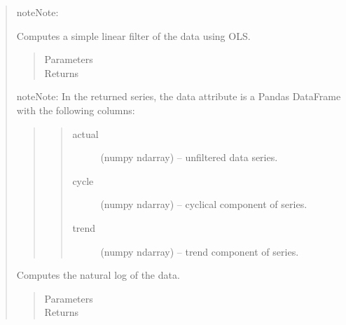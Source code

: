 \documentclass[letterpaper,10pt,english]{sphinxmanual}
\begin{document}
\begin{fulllineitems}
\begin{quote}
\begin{fulllineitems}
\begin{notice}{note}{Note:}
\begin{quote}
\begin{quote}
\begin{description}
\end{description}\end{quote}
\end{quote}
\end{notice}

\end{fulllineitems}


\begin{fulllineitems}
\label{series_class:fredpy.series.lintrend}
Computes a simple linear filter of the data using OLS.
\begin{quote}\begin{description}
\item[{Parameters}] \leavevmode
\item[{Returns}] \leavevmode
{\hyperref[series_class:fredpy.series]{}}

\end{description}\end{quote}

\begin{notice}{note}{Note:}
In the returned series, the data attribute is a Pandas DataFrame with the following columns:
\begin{quote}
\begin{quote}\begin{description}
\item[{actual}] \leavevmode
(numpy ndarray) --  unfiltered data series.

\item[{cycle}] \leavevmode
(numpy ndarray) --  cyclical component of series.

\item[{trend}] \leavevmode
(numpy ndarray) --  trend component of series.

\end{description}\end{quote}
\end{quote}
\end{notice}

\end{fulllineitems}


\begin{fulllineitems}
\label{series_class:fredpy.series.log}
Computes the natural log of the data.
\begin{quote}\begin{description}
\item[{Parameters}] \leavevmode
\item[{Returns}] \leavevmode
{\hyperref[series_class:fredpy.series]{}}


\end{description}
\end{quote}
\end{fulllineitems}
\end{quote}
\end{fulllineitems}
\end{document}
